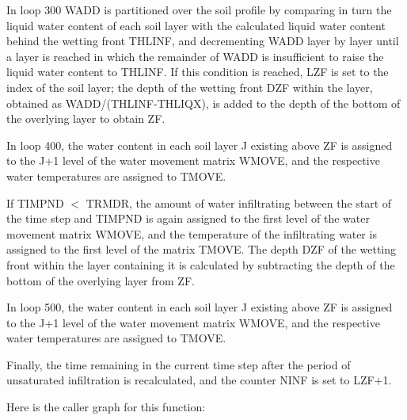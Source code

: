 In loop 300 W\+A\+D\+D is partitioned over the soil profile by comparing in turn the liquid water content of each soil layer with the calculated liquid water content behind the wetting front T\+H\+L\+I\+N\+F, and decrementing W\+A\+D\+D layer by layer until a layer is reached in which the remainder of W\+A\+D\+D is insufficient to raise the liquid water content to T\+H\+L\+I\+N\+F. If this condition is reached, L\+Z\+F is set to the index of the soil layer; the depth of the wetting front D\+Z\+F within the layer, obtained as W\+A\+D\+D/(T\+H\+L\+I\+N\+F-\/\+T\+H\+L\+I\+Q\+X), is added to the depth of the bottom of the overlying layer to obtain Z\+F.

In loop 400, the water content in each soil layer J existing above Z\+F is assigned to the J+1 level of the water movement matrix W\+M\+O\+V\+E, and the respective water temperatures are assigned to T\+M\+O\+V\+E.

If T\+I\+M\+P\+N\+D $<$ T\+R\+M\+D\+R, the amount of water infiltrating between the start of the time step and T\+I\+M\+P\+N\+D is again assigned to the first level of the water movement matrix W\+M\+O\+V\+E, and the temperature of the infiltrating water is assigned to the first level of the matrix T\+M\+O\+V\+E. The depth D\+Z\+F of the wetting front within the layer containing it is calculated by subtracting the depth of the bottom of the overlying layer from Z\+F.

In loop 500, the water content in each soil layer J existing above Z\+F is assigned to the J+1 level of the water movement matrix W\+M\+O\+V\+E, and the respective water temperatures are assigned to T\+M\+O\+V\+E.

Finally, the time remaining in the current time step after the period of unsaturated infiltration is recalculated, and the counter N\+I\+N\+F is set to L\+Z\+F+1.

Here is the caller graph for this function\+:


